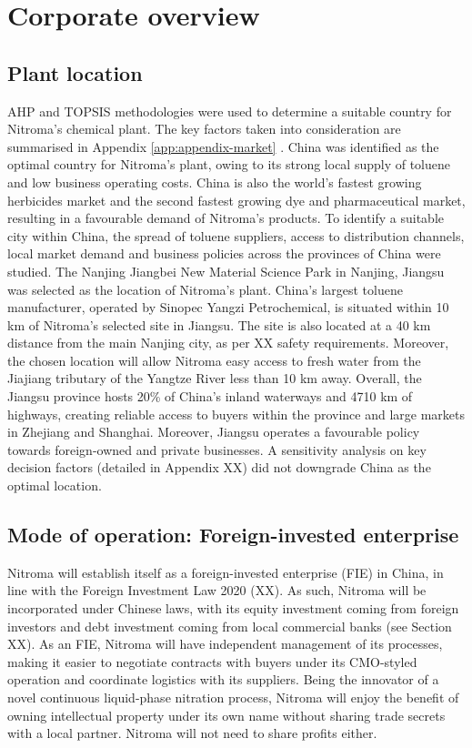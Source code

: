 \section{Corporate overview}
\subsection{Plant location}
\label{sec:location}
AHP and TOPSIS methodologies were used to determine a suitable country for Nitroma’s chemical plant. The key factors taken into consideration are summarised in Appendix \ref{app:appendix-market} . China was identified as the optimal country for Nitroma's plant, owing to its strong local supply of toluene and low business operating costs. China is also the world’s fastest growing herbicides market and the second fastest growing dye and pharmaceutical market, resulting in a favourable demand of Nitroma’s products. To identify a suitable city within China, the spread of toluene suppliers, access to distribution channels, local market demand and business policies across the provinces of China were studied. The Nanjing Jiangbei New Material Science Park in Nanjing, Jiangsu was selected as the location of Nitroma’s plant. China’s largest toluene manufacturer, operated by Sinopec Yangzi Petrochemical, is situated within 10 km of Nitroma’s selected site in Jiangsu. The site is also located at a 40 km distance from the main Nanjing city, as per XX safety requirements. Moreover, the chosen location will allow Nitroma easy access to fresh water from the Jiajiang tributary of the Yangtze River less than 10 km away. Overall, the Jiangsu province hosts 20\% of China’s inland waterways and 4710 km of highways, creating reliable access to buyers within the province and large markets in Zhejiang and Shanghai. Moreover, Jiangsu operates a favourable policy towards foreign-owned and private businesses. A sensitivity analysis on key decision factors (detailed in Appendix XX) did not downgrade China as the optimal location.

\subsection{Mode of operation: Foreign-invested enterprise}
\label{sec:mode-of-operation}
Nitroma will establish itself as a foreign-invested enterprise (FIE) in China, in line with the Foreign Investment Law 2020 (XX). As such, Nitroma will be incorporated under Chinese laws, with its equity investment coming from foreign investors and debt investment coming from local commercial banks (see Section XX). As an FIE, Nitroma will have independent management of its processes, making it easier to negotiate contracts with buyers under its CMO-styled operation and coordinate logistics with its suppliers. Being the innovator of a novel continuous liquid-phase nitration process, Nitroma will enjoy the benefit of owning intellectual property under its own name without sharing trade secrets with a local partner. Nitroma will not need to share profits either. 


